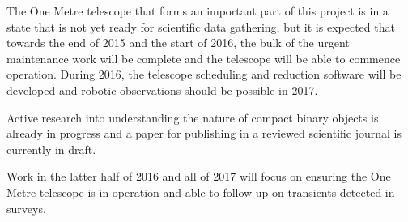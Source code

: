 \documentclass[a4paper,fleqn,usenatbib]{mnras}
\begin{document}
The One Metre telescope that forms an important part of this project is in a state that is not yet ready for scientific data gathering, but it is expected that towards the end of 2015 and the start of 2016, the bulk of the urgent maintenance work will be complete and the telescope will be able to commence operation. During 2016, the telescope scheduling and reduction software will be developed and robotic observations should be possible in 2017.

Active research into understanding the nature of compact binary objects is already in progress and a paper for publishing in a reviewed scientific journal is currently in draft.

Work in the latter half of 2016 and all of 2017 will focus on ensuring the One Metre telescope is in operation and able to follow up on transients detected in surveys.






 










\bsp	%
\label{lastpage}
\end{document}
